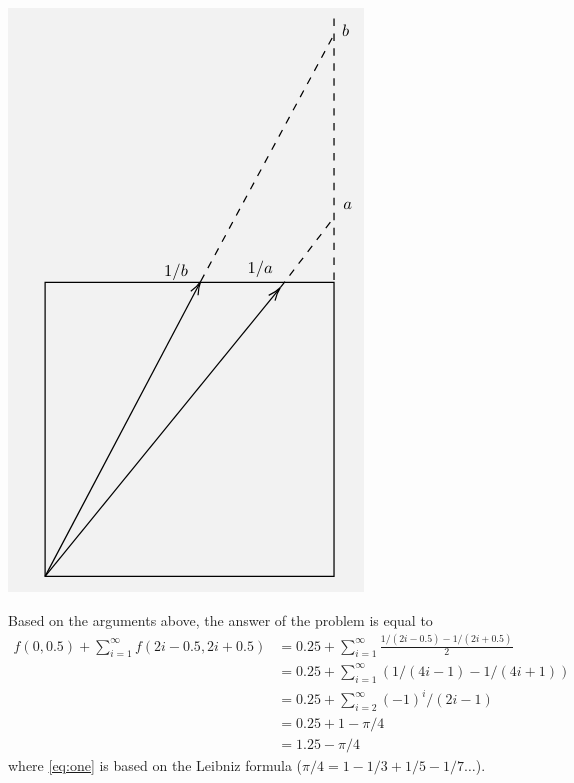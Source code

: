 \begin{solution}
\begin{center}
\includegraphics[width=\textwidth]{83/figs/83_sol2.png}
\end{center}
Based on the arguments above, the answer of the problem is equal to 
\begin{align}
f(0,0.5) + \sum_{i=1}^{\infty} f(2i-0.5, 2i+0.5)  &= 0.25 + \sum_{i=1}^{\infty}  \frac{1/(2i-0.5) - 1/(2i+0.5)}{2} \nonumber  \\
& = 0.25 + \sum_{i=1}^{\infty}  (1/(4i-1) - 1/(4i+1)) \nonumber \\
& = 0.25 + \sum_{i=2}^{\infty}  (-1)^i/(2i-1) \nonumber  \\
& = 0.25 + 1-\pi/4 \label{eq:one}\\
& = 1.25-\pi/4 \nonumber
\end{align}
where \eqref{eq:one} is based on the Leibniz formula ($\pi/4 = 1-1/3 + 1/5 - 1/7 \ldots$).
\end{solution}
